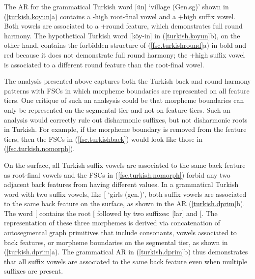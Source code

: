 \documentclass[,doc,floatsintext]{apa6}
\theoremstyle{definition}
\theoremstyle{definition}
\theoremstyle{definition}
\theoremstyle{remark}
\begin{document}
\noindent The AR for the grammatical Turkish word
{[}ün{]} `village (Gen.sg)' shown in
(\ref{turkish.koyun}a) contains a -high root-final vowel and a +high
suffix vowel. Both vowels are associated to a +round feature, which
demonstrates full round harmony. The hypothetical Turkish word
{[}köy-in{]} in (\ref{turkish.koyun}b), on the other hand, contains the
forbidden structure of (\ref{fsc.turkishround}a) in bold and red because
it does not demonstrate full round harmony; the +high suffix vowel is
associated to a different round feature than the root-final vowel.

The analysis presented above captures both the Turkish back and round
harmony patterns with FSCs in which morpheme boundaries are represented
on all feature tiers. One critique of such an analsysis could be that
morpheme boundaries can only be represented on the segmental tier and
not on feature tiers. Such an analysis would correctly rule out
disharmonic suffixes, but not disharmonic roots in Turkish. For example,
if the morpheme boundary is removed from the feature tiers, then the
FSCs in (\ref{fsc.turkishback}) would look like those in
(\ref{fsc.turkish.nomorph}).

\begin{exe}
\ex \label{fsc.turkish.nomorph}
\end{exe}

On the surface, all Turkish suffix vowels are associated to the same
back feature as root-final vowels and the FSCs in
(\ref{fsc.turkish.nomorph}) forbid any two adjacent back features from
having different values. In a grammatical Turkish word with two suffix
vowels, like
{[}\textipa{\LARGE+}\textipa{1n}{]}
`girls (gen.)', both suffix vowels are associated to the same back
feature on the surface, as shown in the AR (\ref{turkish.dprim}b). The
word
{[}\textipa{\LARGE+}\textipa{1n}{]}
contains the root {[}\textipa{k1z}{]} followed by two suffixes:
{[}lar{]} and {[}\textipa{1n}{]}. The representation of these three
morphemes is derived via concatenation of autosegmental graph primitives
that include consonants, vowels associated to back features, or morpheme
boundaries on the segmental tier, as shown in (\ref{turkish.dprim}a).
The grammatical AR in (\ref{turkish.dprim}b) thus demonstrates that all
suffix vowels are associated to the same back feature even when multiple
suffixes are present.
\end{document}
